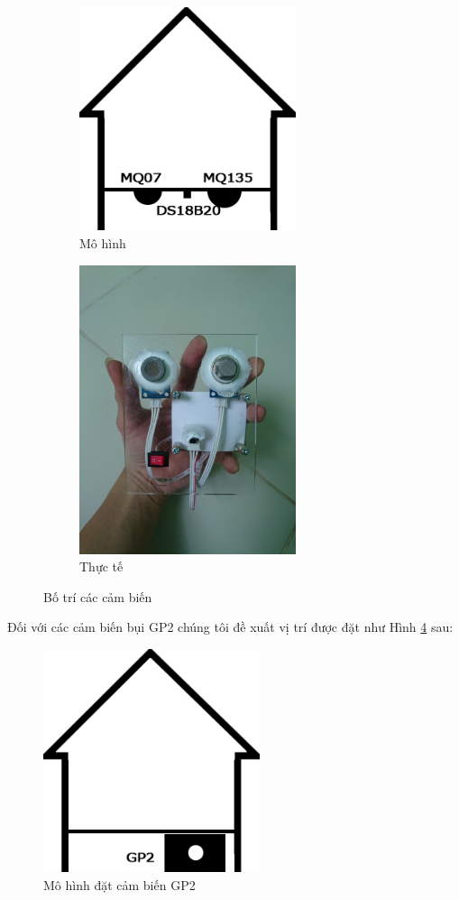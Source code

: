\begin{figure}[H]
	\centering  
	\begin{subfigure}[b]{0.5\textwidth}
		\includegraphics[width=2.5in]{house_sensor}
		\caption[Mô hình]{Mô hình}
		\label{fig:house_sensor}
	\end{subfigure}\hfill
	\begin{subfigure}[b]{0.5\textwidth}
		\includegraphics[width=2.5in]{house_sensor_2}
		\caption[Thực tế]{Thực tế}
		\label{fig:house_sensor_2}
	\end{subfigure}
	\caption{Bố trí các cảm biến}\label{fig:botri}
\end{figure}
Đối với các cảm biến bụi GP2 chúng tôi đề xuất vị trí được đặt như Hình \ref{fig:house_dust} sau:
\begin{figure}[H]
	\centering    
	\includegraphics[width=2.5in]{house_dust}
	\caption[Mô hình đặt cảm biến GP2]{Mô hình đặt cảm biến GP2}
	\label{fig:house_dust}
\end{figure}
